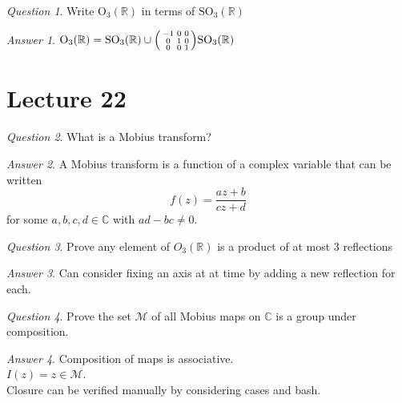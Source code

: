 \documentclass[]{article}
\def\reals{\mathbb{R}}
\def\complex{\mathbb{C}}
\def\mobius{\mathcal{M}}
\newenvironment{psmallmatrix}
  {\left(\begin{smallmatrix}}
  {\end{smallmatrix}\right)}
\theoremstyle{remark}
\theoremstyle{qnstyle}
\newtheorem{question}{Question}
\theoremstyle{answerstyle}
\newtheorem*{answer}{Answer}
\begin{document}
\begin{question}
    Write $\text{O}_3(\reals)$ in terms of $\text{SO}_3(\reals)$
\end{question}
\begin{answer}
    $\text{O}_3(\reals) = \text{SO}_3(\reals) \cup 
    \begin{psmallmatrix}
        -1 & 0 & 0 \\
         0 & 1 & 0 \\
         0 & 0 & 1
    \end{psmallmatrix} \text{SO}_3(\reals) $
\end{answer}






\section* {Lecture 22}

\begin{question}
    What is a Mobius transform?
\end{question}
\begin{answer}
    A Mobius transform is a function of a complex variable that can be written
        $$f(z) = \frac{az + b}{cz + d}$$
    for some $a,b,c,d \in \complex$ with $ad - bc \not = 0$.
\end{answer}

\begin{question}
    Prove any element of $O_3(\reals)$ is a product of at most
    3 reflections
\end{question}
\begin{answer}
    Can consider fixing an axis at at time by adding a new reflection for each.
\end{answer}

\begin{question}
    Prove the set $\mobius$ of all Mobius maps on $\complex$ is a group under 
    composition.
\end{question}
\begin{answer}
    Composition of maps is associative.\\
    $I(z) = z \in \mobius$. \\
    Closure can be verified manually by considering cases and bash.
\end{answer}
\end{document}

